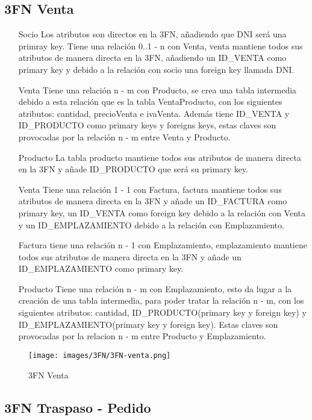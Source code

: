 \subsection{3FN Venta}

 \begin{itemize}
 	\item[Socio] Los atributos son directos en la 3FN, añadiendo que DNI será una primray key. Tiene una relación 0..1 - n con Venta, venta mantiene todos sus atributos de manera directa en la 3FN, añadiendo un ID\_VENTA como
primary key y debido a la relación con socio una foreign key llamada DNI.
 	\item[Venta] Tiene una relación n - m con Producto, se crea una tabla intermedia debido a esta relación que es la tabla VentaProducto, con los siguientes
atributos: cantidad, precioVenta e ivaVenta. Además tiene ID\_VENTA y ID\_PRODUCTO como primary keys y foreigns keys, estas claves son provocadas
por la relación n - m entre Venta y Producto.
 	\item[Producto] La tabla producto mantiene todos sus atributos de manera directa  en la 3FN y añade ID\_PRODUCTO que será su primary key.
 	\item[Venta] Tiene una relación 1 - 1 con Factura, factura mantiene todos sus atributos de manera directa  en la 3FN y añade un ID\_FACTURA como primary key, un ID\_VENTA
 	como foreign key debido a la relación con Venta y un ID\_EMPLAZAMIENTO debido a la relación con Emplazamiento.
 	\item[Factura] tiene una relación n - 1 con Emplazamiento, emplazamiento  mantiene todos sus atributos de manera directa en la 3FN y añade un ID\_EMPLAZAMIENTO como
 	primary key.
 	\item[Producto] Tiene una relación n - m con Emplazamiento, esto da lugar a la creación de una tabla intermedia, para poder tratar la relación n - m, con
 	los siguientes atributos: cantidad, ID\_PRODUCTO(primary key y foreign key) y ID\_EMPLAZAMIENTO(primary key y foreign key). Estas claves son provocadas por
 	la relacion n - m entre Producto y Emplazamiento.
 	
 \end{itemize}

\begin{figure}[H]
	\texttt{[image: images/3FN/3FN-venta.png]}
	\caption{3FN Venta}
\end{figure}

\subsection{3FN Traspaso - Pedido}

